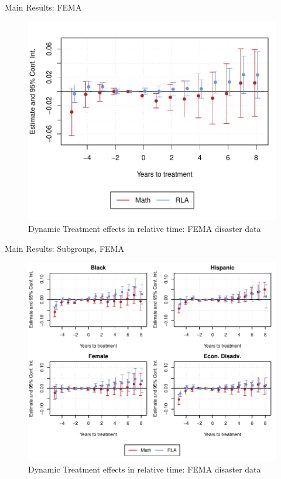 \documentclass[hyperref={colorlinks = true,linkcolor = blue, citecolor=blue,urlcolor=blue}]{beamer}
\begin{document}
\begin{frame}{Main Results: FEMA}
	\begin{figure}[!h]
		\centering
		\includegraphics[scale=0.6]{"../Code & Data/ResultsPlotPresentation.pdf"}
		\caption{Dynamic Treatment effects in relative time: FEMA disaster data}
	\end{figure}
\end{frame}


\begin{frame}{Main Results: Subgroups, FEMA}
	\begin{figure}[!h]
		\centering
		\includegraphics[scale=0.6]{"../Code & Data/ResultsPlotPresentationSubgroups.pdf"}
		\caption{Dynamic Treatment effects in relative time: FEMA disaster data}
	\end{figure}
\end{frame}
\end{document}

